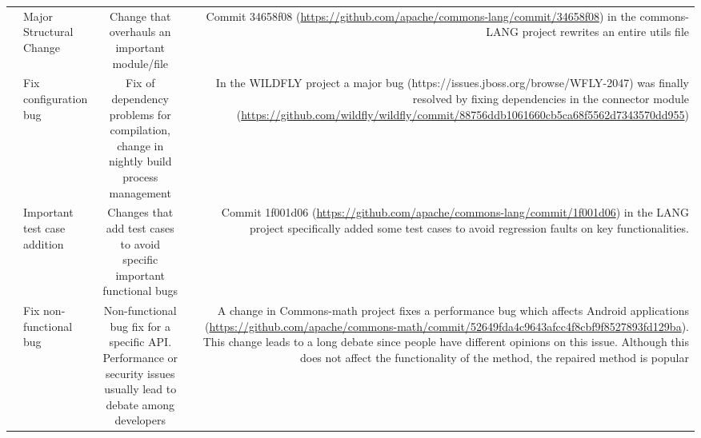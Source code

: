\begin{table}[H]
\begin{tabular} {r | l | c | r}
	&Major Structural Change & \multicolumn{1}{p{4cm}|}{Change that overhauls an important module/file} & \multicolumn{1}{p{5.5cm}}{Commit 34658f08 ({\tiny \url{https://github.com/apache/commons-lang/commit/34658f08}}) in the commons-LANG project rewrites an entire utils file }\\ \cline{2-4}
	&Fix configuration bug & \multicolumn{1}{p{4cm}|}{Fix of dependency problems for compilation, change in nightly build process management} & \multicolumn{1}{p{5.5cm}}{In the WILDFLY project a major bug (https://issues.jboss.org/browse/WFLY-2047) was finally resolved by fixing dependencies in the connector module ({\tiny \url{https://github.com/wildfly/wildfly/commit/88756ddb1061660cb5ca68f5562d7343570dd955}})}\\ \cline{2-4}
	&Important test case addition & \multicolumn{1}{p{4cm}|}{Changes that add test cases to avoid specific important functional bugs} & \multicolumn{1}{p{5.5cm}}{Commit 1f001d06 ({\tiny \url{https://github.com/apache/commons-lang/commit/1f001d06}}) in the LANG project specifically added some test cases to avoid regression faults on key functionalities.}\\ \hline\hline
	&Fix non-functional bug & \multicolumn{1}{p{4cm}|}{Non-functional bug fix for a specific API. Performance or security issues usually lead to debate among developers } & \multicolumn{1}{p{5.5cm}}{ A change in Commons-math project fixes a performance bug which affects Android applications ({\tiny \url{https://github.com/apache/commons-math/commit/52649fda4c9643afcc4f8cbf9f8527893fd129ba}}). This change leads to a long debate since people have different opinions on this issue. Although this does not affect the functionality of the method, the repaired method is popular}\\\cline{2-4}
		\end{tabular}
		\label{tab:ics}

\end{table}


